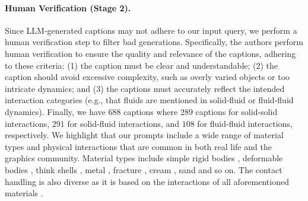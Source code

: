 \paragraph{Human Verification (Stage 2).} Since LLM-generated captions may not adhere to our input query, we perform a human verification step to filter bad generations. Specifically, the authors perform human verification to ensure the quality and relevance of the captions, adhering to these criteria: (1) the caption must be clear and understandable; (2) the caption should avoid excessive complexity, such as overly varied objects or too intricate dynamics; and (3) the captions must accurately reflect the intended interaction categories (e.g., that fluids are mentioned in solid-fluid or fluid-fluid dynamics). 
Finally, we have $688$ captions where $289$ captions for solid-solid interactions, $291$ for solid-fluid interactions, and $108$ for fluid-fluid interactions, respectively. We highlight that our prompts include a wide range of material types and physical interactions that are common in both real life and the graphics community. Material types include simple rigid bodies \cite{liang2018gpu}, deformable bodies \cite{huang2021plasticinelab}, think shells \cite{chen2018physical}, metal \cite{li2022energetically}, fracture \cite{wolper2020anisompm}, cream \cite{yue2015continuum}, sand \cite{klar2016drucker} and so on. The contact handling is also diverse as it is based on the interactions of all aforementioned materials \cite{gu2023maniskill2, li2020incremental, han2023convex, zong2024convex}. 


